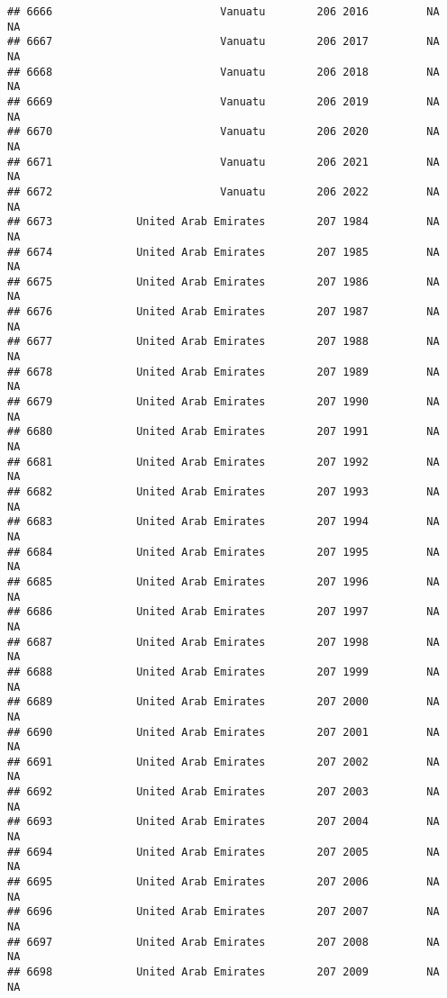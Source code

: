 \documentclass[
]{article}
\begin{document}
\begin{verbatim}
## 6666                          Vanuatu        206 2016         NA         NA
## 6667                          Vanuatu        206 2017         NA         NA
## 6668                          Vanuatu        206 2018         NA         NA
## 6669                          Vanuatu        206 2019         NA         NA
## 6670                          Vanuatu        206 2020         NA         NA
## 6671                          Vanuatu        206 2021         NA         NA
## 6672                          Vanuatu        206 2022         NA         NA
## 6673             United Arab Emirates        207 1984         NA         NA
## 6674             United Arab Emirates        207 1985         NA         NA
## 6675             United Arab Emirates        207 1986         NA         NA
## 6676             United Arab Emirates        207 1987         NA         NA
## 6677             United Arab Emirates        207 1988         NA         NA
## 6678             United Arab Emirates        207 1989         NA         NA
## 6679             United Arab Emirates        207 1990         NA         NA
## 6680             United Arab Emirates        207 1991         NA         NA
## 6681             United Arab Emirates        207 1992         NA         NA
## 6682             United Arab Emirates        207 1993         NA         NA
## 6683             United Arab Emirates        207 1994         NA         NA
## 6684             United Arab Emirates        207 1995         NA         NA
## 6685             United Arab Emirates        207 1996         NA         NA
## 6686             United Arab Emirates        207 1997         NA         NA
## 6687             United Arab Emirates        207 1998         NA         NA
## 6688             United Arab Emirates        207 1999         NA         NA
## 6689             United Arab Emirates        207 2000         NA         NA
## 6690             United Arab Emirates        207 2001         NA         NA
## 6691             United Arab Emirates        207 2002         NA         NA
## 6692             United Arab Emirates        207 2003         NA         NA
## 6693             United Arab Emirates        207 2004         NA         NA
## 6694             United Arab Emirates        207 2005         NA         NA
## 6695             United Arab Emirates        207 2006         NA         NA
## 6696             United Arab Emirates        207 2007         NA         NA
## 6697             United Arab Emirates        207 2008         NA         NA
## 6698             United Arab Emirates        207 2009         NA         NA

\end{verbatim}
\end{document}
